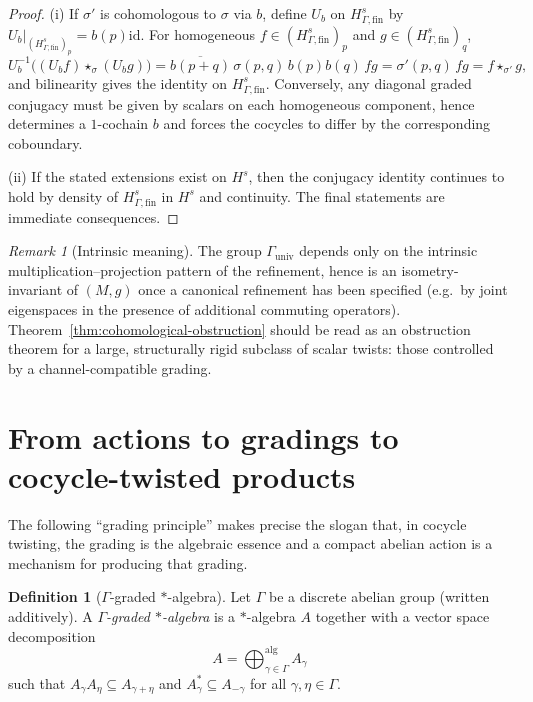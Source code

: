 \documentclass[11pt]{amsart}
\theoremstyle{plain}
\theoremstyle{definition}
\newtheorem{definition}[theorem]{Definition}
\theoremstyle{remark}
\newtheorem{remark}[theorem]{Remark}
\begin{document}
\begin{proof}
(i) If $\sigma'$ is cohomologous to $\sigma$ via $b$, define $U_b$ on $H^s_{\Gamma,\mathrm{fin}}$ by $U_b|_{(H^s_{\Gamma,\mathrm{fin}})_p}=b(p)\mathrm{id}$.
For homogeneous $f\in(H^s_{\Gamma,\mathrm{fin}})_p$ and $g\in(H^s_{\Gamma,\mathrm{fin}})_q$,
\[
U_b^{-1}\bigl((U_b f)\star_\sigma (U_b g)\bigr)
=\overline{b(p+q)}\,\sigma(p,q)\,b(p)b(q)\,fg
=\sigma'(p,q)\,fg
=f\star_{\sigma'}g,
\]
and bilinearity gives the identity on $H^s_{\Gamma,\mathrm{fin}}$.
Conversely, any diagonal graded conjugacy must be given by scalars on each homogeneous component, hence determines a $1$-cochain $b$
and forces the cocycles to differ by the corresponding coboundary.

(ii) If the stated extensions exist on $H^s$, then the conjugacy identity continues to hold by density of $H^s_{\Gamma,\mathrm{fin}}$ in $H^s$ and continuity.
The final statements are immediate consequences.
\end{proof}
\begin{remark}[Intrinsic meaning]\label{rem:intrinsic-meaning}
The group $\Gamma_{\mathrm{univ}}$ depends only on the intrinsic multiplication--projection pattern of the refinement,
hence is an isometry-invariant of $(M,g)$ once a canonical refinement has been specified (e.g.\ by joint eigenspaces in
the presence of additional commuting operators).  Theorem~\ref{thm:cohomological-obstruction} should be read as an
obstruction theorem for a large, structurally rigid subclass of scalar twists: those controlled by a channel-compatible
grading.
\end{remark}


\section{From actions to gradings to cocycle-twisted products}\label{subsec:action-grading-twist}

The following ``grading principle'' makes precise the slogan that, in cocycle twisting,
the grading is the algebraic essence and a compact abelian action is a mechanism for producing that grading.

\begin{definition}[$\Gamma$-graded $*$-algebra]\label{def:graded-star-alg}
Let $\Gamma$ be a discrete abelian group (written additively).
A \emph{$\Gamma$-graded $*$-algebra} is a $*$-algebra $A$ together with a vector space decomposition
\[
A=\bigoplus_{\gamma\in\Gamma}^{\mathrm{alg}} A_\gamma
\]
such that $A_\gamma A_\eta\subseteq A_{\gamma+\eta}$ and $A_\gamma^*\subseteq A_{-\gamma}$ for all $\gamma,\eta\in\Gamma$.
\end{definition}
\end{document}
